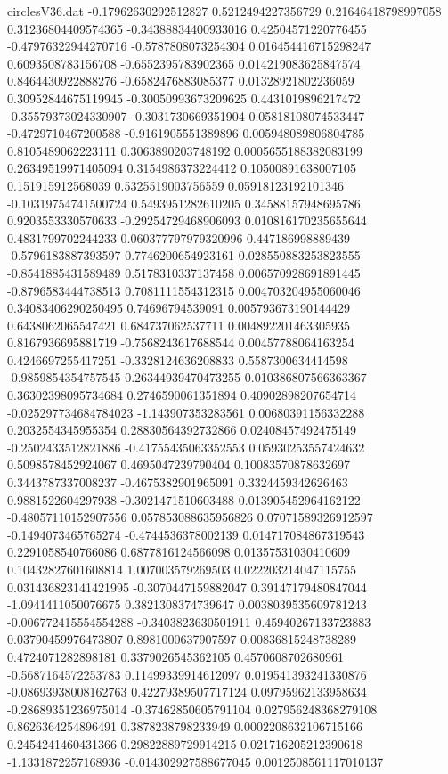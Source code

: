 \begin{filecontents}{circlesV36.dat}
-0.17962630292512827	0.5212494227356729	0.21646418798997058
0.31236804409574365	-0.34388834400933016	0.42504571220776455
-0.47976322944270716	-0.5787808073254304	0.016454416715298247
0.6093508783156708	-0.6552395783902365	0.014219083625847574
0.8464430922888276	-0.6582476883085377	0.01328921802236059
0.30952844675119945	-0.30050993673209625	0.4431019896217472
-0.35579373024330907	-0.3031730669351904	0.05818108074533447
-0.4729710467200588	-0.9161905551389896	0.005948089806804785
0.8105489062223111	0.3063890203748192	0.0005655188382083199
0.26349519971405094	0.3154986373224412	0.10500891638007105
0.151915912568039	0.5325519003756559	0.05918123192101346
-0.10319754741500724	0.5493951282610205	0.34588157948695786
0.9203553330570633	-0.29254729468906093	0.010816170235655644
0.4831799702244233	0.060377797979320996	0.447186998889439
-0.5796183887393597	0.7746200654923161	0.028550883253823555
-0.8541885431589489	0.5178310337137458	0.006570928691891445
-0.8796583444738513	0.7081111554312315	0.004703204955060046
0.34083406290250495	0.74696794539091	0.005793673190144429
0.6438062065547421	0.684737062537711	0.004892201463305935
0.8167936695881719	-0.7568243617688544	0.00457788064163254
0.4246697255417251	-0.3328124636208833	0.5587300634414598
-0.9859854354757545	0.26344939470473255	0.010386807566363367
0.36302398095734684	0.2746590061351894	0.40902898207654714
-0.025297734684784023	-1.143907353283561	0.00680391156332288
0.2032554345955354	0.28830564392732866	0.02408457492475149
-0.2502433512821886	-0.41755435063352553	0.05930253557424632
0.5098578452924067	0.4695047239790404	0.10083570878632697
0.3443787337008237	-0.4675382901965091	0.3324459342626463
0.9881522604297938	-0.3021471510603488	0.013905452964162122
-0.48057110152907556	0.057853088635956826	0.07071589326912597
-0.1494073465765274	-0.4744536378002139	0.014717084867319543
0.2291058540766086	0.6877816124566098	0.01357531030410609
0.10432827601608814	1.007003579269503	0.022203214047115755
0.031436823141421995	-0.3070447159882047	0.39147179480847044
-1.0941411050076675	0.3821308374739647	0.0038039535609781243
-0.006772415554554288	-0.3403823630501911	0.45940267133723883
0.03790459976473807	0.8981000637907597	0.00836815248738289
0.4724071282898181	0.3379026545362105	0.4570608702680961
-0.5687164572253783	0.11499339914612097	0.019541393241330876
-0.08693938008162763	0.42279389507717124	0.09795962133958634
-0.28689351236975014	-0.37462850605791104	0.027956248368279108
0.8626364254896491	0.3878238798233949	0.0002208632106715166
0.2454241460431366	0.29822889729914215	0.021716205212390618
-1.1331872257168936	-0.014302927588677045	0.0012508561117010137

\end{filecontents}
